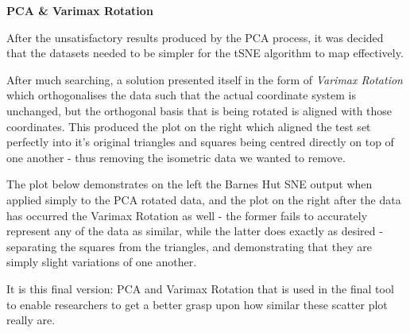 \documentclass[a4paper,11pt,titlepage]{article}
\begin{document}
	\textbf{PCA \& Varimax Rotation}
	\par
	After the unsatisfactory results produced by the PCA process, it was decided that the datasets needed to be simpler for the tSNE algorithm to map effectively. 
	\par 
	After much searching, a solution presented itself in the form of \textit{Varimax Rotation} \cite{Lin2012} which orthogonalises the data such that the actual coordinate system is unchanged, but the orthogonal basis that is being rotated is aligned with those coordinates. This produced the plot on the right which aligned the test set perfectly into it's original triangles and squares being centred directly on top of one another - thus removing the isometric data we wanted to remove.
	\par 
	The plot below demonstrates on the left the Barnes Hut SNE output when applied simply to the PCA rotated data, and the plot on the right after the data has occurred the Varimax Rotation as well - the former fails to accurately represent any of the data as similar, while the latter does exactly as desired - separating the squares from the triangles, and demonstrating that they are simply slight variations of one another.

	\begin{figure}[H]
    			\centering	
    			 \qquad
    			\caption{}%
    			\label{fig:pca_varimax}
	\end{figure}


	It is this final version: PCA and Varimax Rotation that is used in the final tool to enable researchers to get a better grasp upon how similar these scatter plot really are.
	
\end{document}
